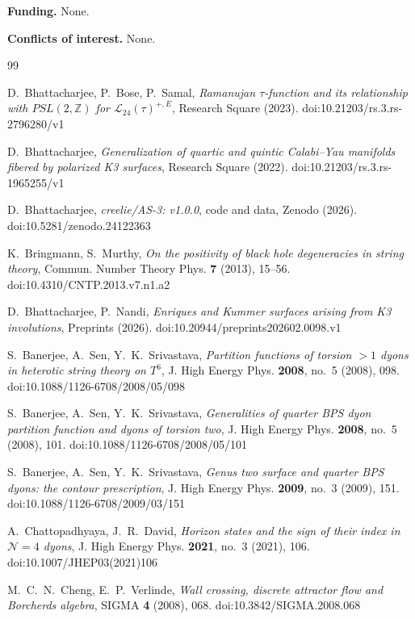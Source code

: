 \documentclass[11pt]{amsart}
\theoremstyle{definition}
\newcommand{\zenodoDOI}{10.5281/zenodo.24122363}
\begin{document}
\smallskip\noindent\textbf{Funding.} None.

\smallskip\noindent\textbf{Conflicts of interest.} None.

\begin{thebibliography}{99}

 D.~Bhattacharjee, P.~Bose, P.~Samal, \emph{Ramanujan $\tau$-function and its relationship with $PSL(2,\mathbb Z)$ for $\mathcal L_{24}(\tau)^{+,E}$}, Research Square (2023). doi:10.21203/rs.3.rs-2796280/v1

 D.~Bhattacharjee, \emph{Generalization of quartic and quintic Calabi--Yau manifolds fibered by polarized K3 surfaces}, Research Square (2022). doi:10.21203/rs.3.rs-1965255/v1

 D.~Bhattacharjee, \emph{creelie/AS-3: v1.0.0}, code and data, Zenodo (2026). doi:\zenodoDOI

 K.~Bringmann, S.~Murthy, \emph{On the positivity of black hole degeneracies in string theory}, Commun. Number Theory Phys. \textbf{7} (2013), 15--56. doi:10.4310/CNTP.2013.v7.n1.a2

 D.~Bhattacharjee, P.~Nandi, \emph{Enriques and Kummer surfaces arising from K3 involutions}, Preprints (2026). doi:10.20944/preprints202602.0098.v1

 S.~Banerjee, A.~Sen, Y.~K.~Srivastava, \emph{Partition functions of torsion $>1$ dyons in heterotic string theory on $T^6$}, J. High Energy Phys. \textbf{2008}, no.~5 (2008), 098. doi:10.1088/1126-6708/2008/05/098

 S.~Banerjee, A.~Sen, Y.~K.~Srivastava, \emph{Generalities of quarter BPS dyon partition function and dyons of torsion two}, J. High Energy Phys. \textbf{2008}, no.~5 (2008), 101. doi:10.1088/1126-6708/2008/05/101

 S.~Banerjee, A.~Sen, Y.~K.~Srivastava, \emph{Genus two surface and quarter BPS dyons: the contour prescription}, J. High Energy Phys. \textbf{2009}, no.~3 (2009), 151. doi:10.1088/1126-6708/2009/03/151

 A.~Chattopadhyaya, J.~R.~David, \emph{Horizon states and the sign of their index in $\mathcal N=4$ dyons}, J. High Energy Phys. \textbf{2021}, no.~3 (2021), 106. doi:10.1007/JHEP03(2021)106

 M.~C.~N.~Cheng, E.~P.~Verlinde, \emph{Wall crossing, discrete attractor flow and Borcherds algebra}, SIGMA \textbf{4} (2008), 068. doi:10.3842/SIGMA.2008.068


\end{thebibliography}
\end{document}
